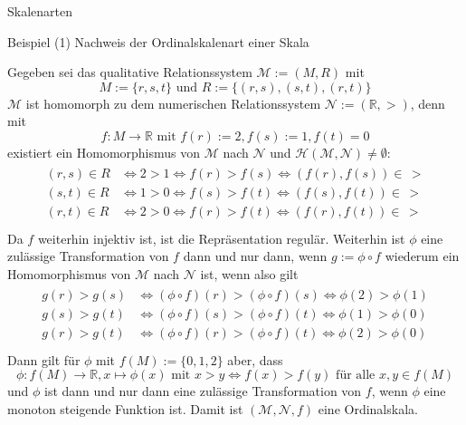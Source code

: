 \documentclass[
  8pt,
  ignorenonframetext,
]{beamer}
\begin{document}
\begin{frame}{Skalenarten}
\protect\hypertarget{skalenarten-4}{}
\vspace{1mm}
\small

Beispiel (1) Nachweis der Ordinalskalenart einer Skala

\footnotesize
{}

Gegeben sei das qualitative Relationssystem \(\mathcal{M} := (M,R)\) mit
\begin{equation}
M := \{r,s,t\} \mbox{ und } R := \{(r,s),(s,t),(r,t)\}
\end{equation} \(\mathcal{M}\) ist homomorph zu dem numerischen
Relationssystem \(\mathcal{N} := (\mathbb{R},>)\), denn mit
\begin{equation}
f : M \to \mathbb{R} \mbox{ mit } f(r) := 2, f(s) := 1, f(t) = 0
\end{equation} existiert ein Homomorphismus von \(\mathcal{M}\) nach
\(\mathcal{N}\) und
\(\mathcal{H}(\mathcal{M},\mathcal{N})\neq \emptyset\): \begin{align}
\begin{split}
(r,s) \in R & \Leftrightarrow 2 > 1 \Leftrightarrow f(r) > f(s) \Leftrightarrow (f(r), f(s)) \in\, > \\
(s,t) \in R & \Leftrightarrow 1 > 0 \Leftrightarrow f(s) > f(t) \Leftrightarrow (f(s), f(t)) \in\, > \\
(r,t) \in R & \Leftrightarrow 2 > 0 \Leftrightarrow f(r) > f(t) \Leftrightarrow (f(r), f(t)) \in\, > \\
\end{split}
\end{align} Da \(f\) weiterhin injektiv ist, ist die Repräsentation
regulär. Weiterhin ist \(\phi\) eine zulässige Transformation von \(f\)
dann und nur dann, wenn \(g := \phi \circ f\) wiederum ein
Homomorphismus von \(\mathcal{M}\) nach \(\mathcal{N}\) ist, wenn also
gilt \begin{align}
\begin{split}
g(r) > g(s) & \Leftrightarrow (\phi \circ f)(r) > (\phi \circ f)(s) \Leftrightarrow \phi(2) > \phi(1) \\
g(s) > g(t) & \Leftrightarrow (\phi \circ f)(s) > (\phi \circ f)(t) \Leftrightarrow \phi(1) > \phi(0) \\
g(r) > g(t) & \Leftrightarrow (\phi \circ f)(r) > (\phi \circ f)(t) \Leftrightarrow \phi(2) > \phi(0) \\
\end{split}
\end{align} Dann gilt für \(\phi\) mit \(f(M) := \{0,1,2\}\) aber, dass
\begin{equation}
\phi : f(M) \to \mathbb{R}, x \mapsto \phi(x)  \mbox{ mit } x > y \Leftrightarrow f(x) > f(y) \mbox{ für alle } x,y \in f(M)
\end{equation} und \(\phi\) ist dann und nur dann eine zulässige
Transformation von \(f\), wenn \(\phi\) eine monoton steigende Funktion
ist. Damit ist \((\mathcal{M}, \mathcal{N},f)\) eine Ordinalskala.
\end{frame}
\end{document}
